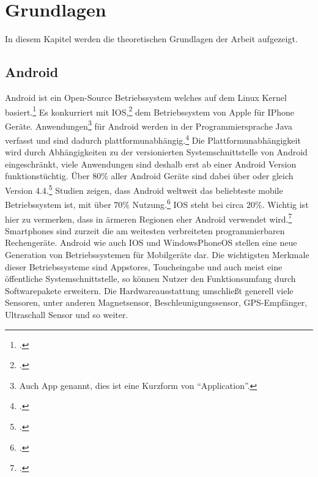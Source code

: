 \section{Grundlagen}
	In diesem Kapitel werden die theoretischen Grundlagen der Arbeit aufgezeigt.
\subsection{Android}\label{ssec:android}
	Android ist ein Open-Source Betriebssystem welches auf dem Linux Kernel basiert.\footcite{android} Es konkurriert mit IOS,\footcite{ios} dem Betriebssystem von Apple für IPhone Geräte. Anwendungen\footnote{Auch App genannt, dies ist eine Kurzform von \enquote{Application}.} für Android werden in der Programmiersprache Java verfasst und sind dadurch plattformunabhängig.\footcite{java} Die Plattformunabhängigkeit wird durch Abhängigkeiten zu der versionierten Systemschnittstelle von Android eingeschränkt, viele Anwendungen sind deshalb erst ab einer Android Version funktionstüchtig. Über $80$\% aller Android Geräte sind dabei über oder gleich Version 4.4.\footcite{android-fragmentation}
	Studien zeigen, dass Android weltweit das beliebteste mobile Betriebssystem ist, mit über $70$\% Nutzung.\footcite[\url{http://gs.statcounter.com/\#mobile_os-ww-monthly-200812-201701}]{android-stats} IOS steht bei circa $20$\%. Wichtig ist hier zu vermerken, dass in ärmeren Regionen eher Android verwendet wird.\footcite[\url{http://gs.statcounter.com/\#mobile_os-ww-monthly-201701-201701-map}]{android-stats} Smartphones sind zurzeit die am weitesten verbreiteten programmierbaren Rechengeräte.
	Android wie auch IOS und WindowsPhoneOS stellen eine neue Generation von Betriebssystemen für Mobilgeräte dar. Die wichtigsten Merkmale dieser Betriebssysteme sind Appstores, Toucheingabe und auch meist eine öffentliche Systemschnittstelle, so können Nutzer den Funktionsumfang durch Softwarepakete erweitern.
	Die Hardwareausstattung umschließt generell viele Sensoren, unter anderen Magnetsensor, Beschleunigungssensor, GPS-Empfänger, Ultraschall Sensor und so weiter.

